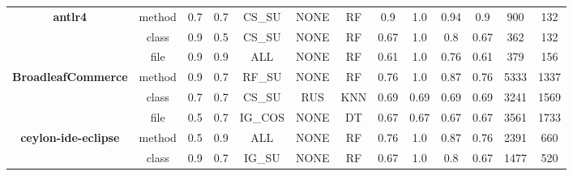 \begin{table}[H]
{\begin{tabular}{@{}ccccccccccccc@{}}
                                                         \hline
\multirow{3}{*}{\textbf{antlr4}}                         & method                 & 0.7        & 0.7           & CS\_SU                   & NONE                       & RF             & 0.9                & 1.0             & 0.94       & 0.9               & 900                & 132           \\
                                                         & class                  & 0.9        & 0.5           & CS\_SU                   & NONE                       & RF             & 0.67               & 1.0             & 0.8        & 0.67              & 362                & 132           \\
                                                         & file                   & 0.9        & 0.9           & ALL                      & NONE                       & RF             & 0.61               & 1.0             & 0.76       & 0.61              & 379                & 156           \\
                                                         \hline
\multirow{3}{*}{\textbf{BroadleafCommerce}}              & method                 & 0.9        & 0.7           & RF\_SU                   & NONE                       & RF             & 0.76               & 1.0             & 0.87       & 0.76              & 5333               & 1337          \\
                                                         & class                  & 0.7        & 0.7           & CS\_SU                   & RUS                        & KNN            & 0.69               & 0.69            & 0.69       & 0.69              & 3241               & 1569          \\
                                                         & file                   & 0.5        & 0.7           & IG\_COS                  & NONE                       & DT             & 0.67               & 0.67            & 0.67       & 0.67              & 3561               & 1733          \\
                                                         \hline
\multirow{3}{*}{\textbf{ceylon-ide-eclipse}}             & method                 & 0.5        & 0.9           & ALL                      & NONE                       & RF             & 0.76               & 1.0             & 0.87       & 0.76              & 2391               & 660           \\
                                                         & class                  & 0.9        & 0.7           & IG\_SU                   & NONE                       & RF             & 0.67               & 1.0             & 0.8        & 0.67              & 1477               & 520           \\
                                                         

\end{tabular}}
\end{table}
